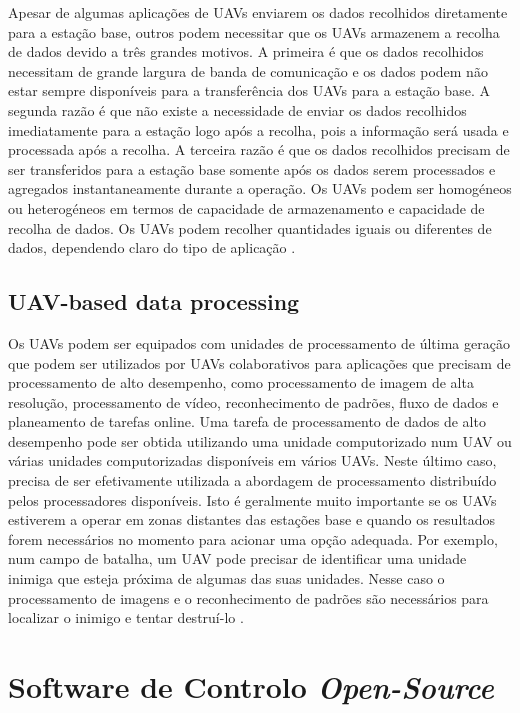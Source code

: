Apesar de algumas aplicações de UAVs enviarem os dados recolhidos diretamente para a estação base, outros podem necessitar que os UAVs armazenem a recolha de dados devido a três grandes motivos. A primeira é que os dados recolhidos necessitam de grande largura de banda de comunicação e os dados podem não estar sempre disponíveis para a transferência dos UAVs para a estação base. A segunda razão é que não existe a necessidade de enviar os dados recolhidos imediatamente para a estação logo após a recolha, pois a informação será usada e processada após a recolha. A terceira razão é que os dados recolhidos precisam de ser transferidos para a estação base somente após os dados serem processados e agregados instantaneamente durante a operação. Os UAVs podem ser homogéneos ou heterogéneos em termos de capacidade de armazenamento e capacidade de recolha de dados. Os UAVs podem recolher quantidades iguais ou diferentes de dados, dependendo claro do tipo de aplicação \cite{ImadJawhar2017}.

\subsection{UAV-based data processing}

Os UAVs podem ser equipados com unidades de processamento de última geração que podem ser utilizados por UAVs colaborativos para aplicações que precisam de processamento de alto desempenho, como processamento de imagem de alta resolução, processamento de vídeo, reconhecimento de padrões, fluxo de dados e planeamento de tarefas online. Uma tarefa de processamento de dados de alto desempenho pode ser obtida utilizando uma unidade computorizado num UAV ou várias unidades computorizadas disponíveis em vários UAVs. Neste último caso, precisa de ser efetivamente utilizada a abordagem de processamento distribuído pelos processadores disponíveis. Isto é geralmente muito importante se os UAVs estiverem a operar em zonas distantes das estações base e quando os resultados forem necessários no momento para acionar uma opção adequada. Por exemplo, num campo de batalha, um UAV pode precisar de identificar uma unidade inimiga que esteja próxima de algumas das suas unidades. Nesse caso o processamento de imagens e o reconhecimento de padrões são necessários para localizar o inimigo e tentar destruí-lo \cite{ImadJawhar2017}.

\section{Software de Controlo \textit{Open-Source}}\label{chap:cs_opensource}

